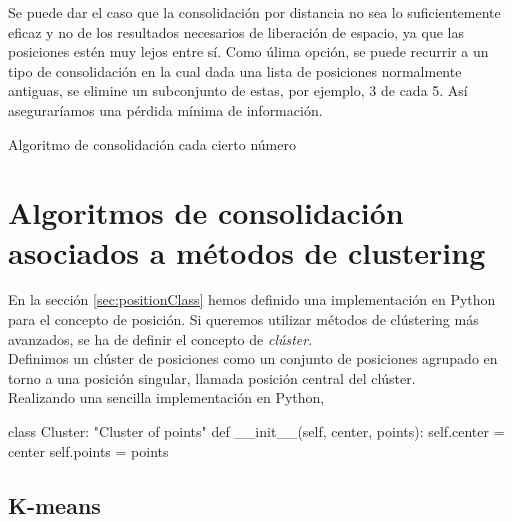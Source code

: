 \documentclass[a4paper, 12pt]{article}
\begin{document}
Se puede dar el caso que la consolidaci\'on por distancia no sea lo suficientemente eficaz y no de los resultados necesarios de liberaci\'on de espacio, ya que las posiciones est\'en muy lejos entre s\'i. Como \'ulima opci\'on, se puede recurrir a un tipo de consolidaci\'on en la cual dada una lista de posiciones normalmente antiguas, se elimine un subconjunto de estas, por ejemplo, 3 de cada 5. As\'i asegurar\'iamos una p\'erdida m\'inima de informaci\'on. \\

\begin{algorithm}[h]\label{consolidationByEachSomeNumber}
\begin{algorithmic}[1]
			\EndFor
		\EndIf
	\EndFor
\EndFunction
\end{algorithmic}
\caption{\label{alg:consolidationByEach} Algoritmo de consolidaci\'on cada cierto n\'umero}
\end{algorithm}


\pagebreak
\section{Algoritmos de consolidaci\'on asociados a m\'etodos de clustering}



En la secci\'on \ref{sec:positionClass} hemos definido una implementaci\'on en Python para el concepto de posici\'on. Si queremos utilizar m\'etodos de cl\'ustering m\'as avanzados, se ha de definir el concepto de \textit{cl\'uster}. \\

Definimos un cl\'uster de posiciones como un conjunto de posiciones agrupado en torno a una posici\'on singular, llamada posici\'on central del cl\'uster.\\

Realizando una sencilla implementaci\'on en Python,


\begin{python}
class Cluster:
	"Cluster of points"
	def __init__(self, center, points):
    	self.center = center
		self.points = points
\end{python}


\pagebreak
\subsection{K-means}
\end{document}
